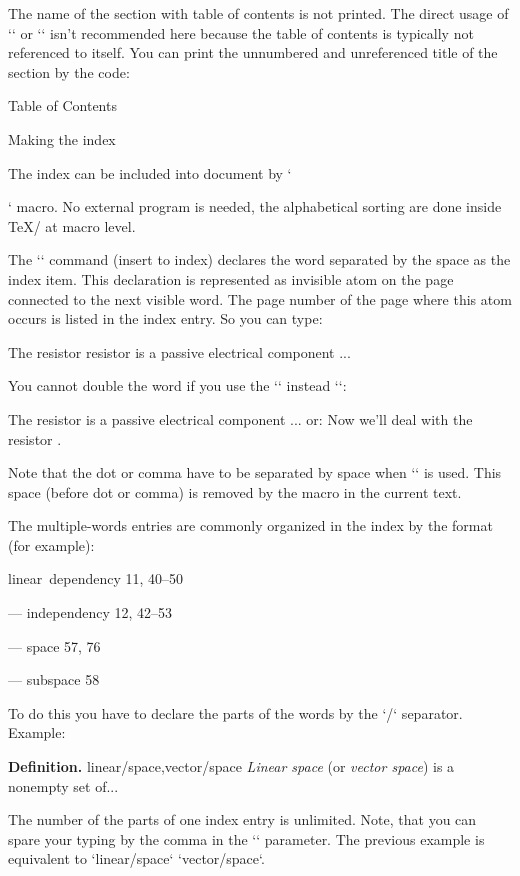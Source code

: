 The name of the section with table of contents is not printed. The direct usage
of `\chap` or `\sec` isn't recommended here because the table of contents 
is typically not referenced to itself. You can print the unnumbered and unreferenced
title of the section by the code:

\begtt
\nonum\notoc\sec Table of Contents
\endtt


\sec Making the index 

The index can be included into document by `\makeindex` macro. No external
program is needed, the alphabetical sorting are done inside \TeX/ at macro
level.

The `\ii` command (insert to index) declares the word separated by the space
as the index item. This declaration is represented as invisible atom on the
page connected to the next visible word. The page number of the page where
this atom occurs is listed in the index entry. So you can type:

\begtt
The \ii resistor resistor is a passive electrical component ...
\endtt

You cannot double the word if you use the `\iid` instead `\ii`:

\begtt
The \iid resistor is a passive electrical component ...
or:
Now we'll deal with the \iid resistor .
\endtt

Note that the dot or comma have to be separated by space when `\iid` is
used. This space (before dot or comma) is removed by the macro in 
the current text.

The multiple-words entries are commonly organized in the index by the format
(for example): 

\medskip

linear~dependency  11, 40--50

--- independency 12, 42--53

--- space 57, 76

--- subspace 58

\medskip

To do this you have to declare the parts of the words by the `/` separator.
Example:

\begtt
{\bf Definition.}
\ii linear/space,vector/space
{\em Linear space} (or {\em vector space}) is a nonempty set of...
\endtt

The number of the parts of one index entry is unlimited. Note, that you can
spare your typing by the comma in the `\ii` parameter. The previous example
is equivalent to `\ii linear/space` `\ii vector/space`.

